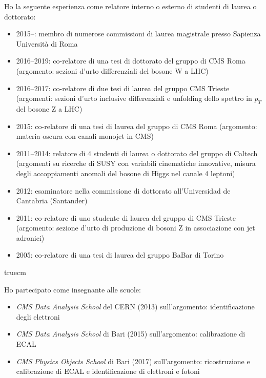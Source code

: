 \documentclass[11pt,twoside,a4paper]{article}
\begin{document}
Ho la seguente esperienza come relatore interno o esterno di studenti di laurea o dottorato:
\begin{itemize}
\item 2015--: membro di numerose commissioni di laurea magistrale
    presso Sapienza Universit\`a di Roma
\item 2016--2019: co-relatore di una tesi di dottorato del gruppo di
  CMS Roma (argomento: sezioni d'urto differenziali del bosone W a
  LHC)
\item 2016--2017: co-relatore di due tesi di laurea del gruppo CMS
  Trieste (argomenti: sezioni d'urto inclusive differenziali e
  unfolding dello spettro in $p_T$ del bosone Z a LHC)
\item 2015: co-relatore di una tesi di laurea del gruppo di CMS Roma
  (argomento: materia oscura con canali monojet in CMS)
\item 2011--2014: relatore di 4 studenti di laurea o dottorato del
  gruppo di Caltech (argomenti su ricerche di SUSY con variabili
  cinematiche innovative, misura degli accoppiamenti anomali del
  bosone di Higgs nel canale 4 leptoni)
\item 2012: esaminatore nella commissione di dottorato all'Universidad
  de Cantabria (Santander)
\item 2011: co-relatore di uno studente di laurea del gruppo di CMS
  Trieste (argomento: sezione d'urto di produzione di bosoni Z in
  associazione con jet adronici)
\item 2005: co-relatore di una tesi di laurea del gruppo BaBar di
    Torino
\end{itemize}
 truecm

Ho partecipato come insegnante alle scuole:
\begin{itemize}
\item \textit{CMS Data Analysis School} del CERN (2013)
  sull'argomento: identificazione degli elettroni
\item \textit{CMS Data Analysis School} di Bari (2015) sull'argomento:
  calibrazione di ECAL
\item \textit{CMS Physics Objects School} di Bari (2017)
  sull'argomento: ricostruzione e calibrazione di ECAL e
  identificazione di elettroni e fotoni
\end{itemize}
\end{document}
